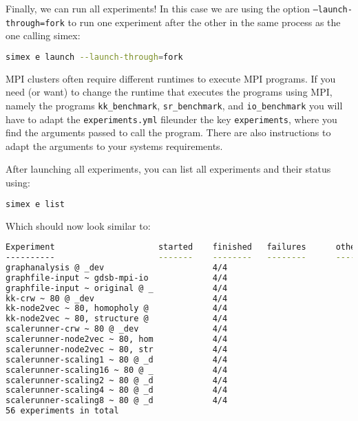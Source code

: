 \documentclass[11pt, a4paper]{scrartcl}
\newcommand{\expfile}{\texttt{experiments.yml} file}
\begin{document}
Finally, we can run all experiments! In this case we are using the option
\texttt{--launch-through=fork} to run one experiment after the other in the same
process as the one calling simex: 

\begin{lstlisting}[language=bash]
simex e launch --launch-through=fork
\end{lstlisting}

MPI clusters often require different runtimes to execute MPI programs. If you
need (or want) to change the runtime that executes the programs using MPI,
namely the programs \texttt{kk\_benchmark}, \texttt{sr\_benchmark}, and
\texttt{io\_benchmark} you will have to adapt the \expfile under the key
\texttt{experiments}, where you find the arguments passed to call the program.
There are also instructions to adapt the arguments to your systems requirements. 

After launching all experiments, you can list all experiments and their status
using:

\begin{lstlisting}[language=bash]
simex e list
\end{lstlisting}

Which should now look similar to:

\begin{lstlisting}[language=bash]
Experiment                     started    finished   failures      other
----------                     -------    --------   --------      -----
graphanalysis @ _dev                      4/4                             
graphfile-input ~ gdsb-mpi-io             4/4                             
graphfile-input ~ original @ _            4/4                             
kk-crw ~ 80 @ _dev                        4/4                             
kk-node2vec ~ 80, homopholy @             4/4                             
kk-node2vec ~ 80, structure @             4/4                             
scalerunner-crw ~ 80 @ _dev               4/4                             
scalerunner-node2vec ~ 80, hom            4/4                             
scalerunner-node2vec ~ 80, str            4/4                             
scalerunner-scaling1 ~ 80 @ _d            4/4                             
scalerunner-scaling16 ~ 80 @ _            4/4                             
scalerunner-scaling2 ~ 80 @ _d            4/4                             
scalerunner-scaling4 ~ 80 @ _d            4/4                             
scalerunner-scaling8 ~ 80 @ _d            4/4                             
56 experiments in total
\end{lstlisting}
\end{document}
